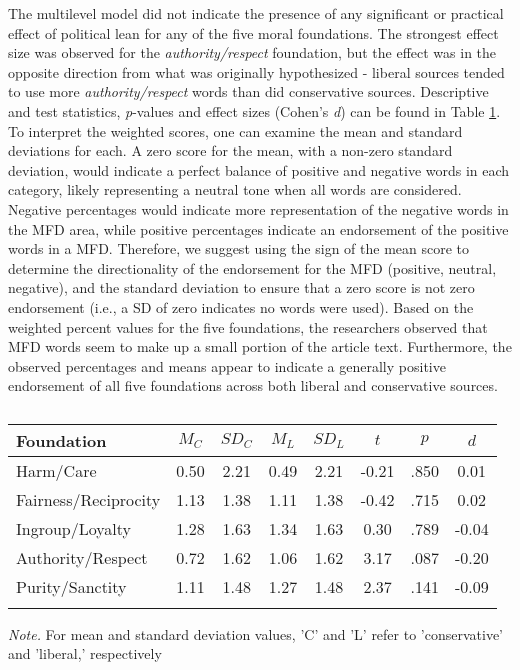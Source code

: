 \documentclass[english,,man]{apa6}
\begin{document}
The multilevel model did not indicate the presence of any significant or
practical effect of political lean for any of the five moral
foundations. The strongest effect size was observed for the
\emph{authority/respect} foundation, but the effect was in the opposite
direction from what was originally hypothesized - liberal sources tended
to use more \emph{authority/respect} words than did conservative
sources. Descriptive and test statistics, \emph{p}-values and effect
sizes (Cohen's \emph{d}) can be found in Table \ref{tab:exp1-table}. To
interpret the weighted scores, one can examine the mean and standard
deviations for each. A zero score for the mean, with a non-zero standard
deviation, would indicate a perfect balance of positive and negative
words in each category, likely representing a neutral tone when all
words are considered. Negative percentages would indicate more
representation of the negative words in the MFD area, while positive
percentages indicate an endorsement of the positive words in a MFD.
Therefore, we suggest using the sign of the mean score to determine the
directionality of the endorsement for the MFD (positive, neutral,
negative), and the standard deviation to ensure that a zero score is not
zero endorsement (i.e., a SD of zero indicates no words were used).
Based on the weighted percent values for the five foundations, the
researchers observed that MFD words seem to make up a small portion of
the article text. Furthermore, the observed percentages and means appear
to indicate a generally positive endorsement of all five foundations
across both liberal and conservative sources.

\begin{table}[tbp]
\begin{center}
\begin{threeparttable}
\caption{\label{tab:exp1-table}}
\begin{tabular}{lccccccc}
\toprule
Foundation & $M_C$ & $SD_C$ & $M_L$ & $SD_L$ & $t$ & $p$ & $d$\\
\midrule
Harm/Care & 0.50 & 2.21 & 0.49 & 2.21 & -0.21 & .850 & 0.01\\
Fairness/Reciprocity & 1.13 & 1.38 & 1.11 & 1.38 & -0.42 & .715 & 0.02\\
Ingroup/Loyalty & 1.28 & 1.63 & 1.34 & 1.63 & 0.30 & .789 & -0.04\\
Authority/Respect & 0.72 & 1.62 & 1.06 & 1.62 & 3.17 & .087 & -0.20\\
Purity/Sanctity & 1.11 & 1.48 & 1.27 & 1.48 & 2.37 & .141 & -0.09\\
\bottomrule
\addlinespace
\end{tabular}
\begin{tablenotes}[para]
\normalsize{\textit{Note.} For mean and standard deviation values, 'C' and 'L' refer to 'conservative' and 'liberal,' respectively}
\end{tablenotes}
\end{threeparttable}
\end{center}
\end{table}
\end{document}
